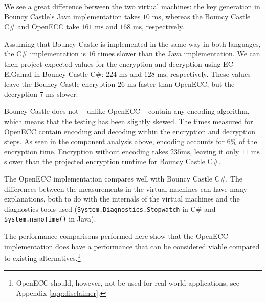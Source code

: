 We see a great difference between the two virtual machines: the key generation in Bouncy Castle's Java implementation takes
\(10 \text{ ms}\), whereas the Bouncy Castle C\# and OpenECC take \(161 \text{ ms}\) and \(168 \text{ ms}\), respectively.

Assuming that Bouncy Castle is implemented in the same way in both languages, the C\# implementation is \(16\) times slower
than the Java implementation. We can then project expected values for the encryption and decryption using EC ElGamal in Bouncy
Castle C\#: \(224 \text{ ms}\) and \(128 \text{ ms}\), respectively. These values leave the Bouncy Castle encryption \(26 \text{ ms}\)
faster than OpenECC, but the decryption \(7 \text{ ms}\) slower.

Bouncy Castle does not -- unlike OpenECC -- contain any encoding algorithm, which means that the testing has been slightly skewed.
The times measured for OpenECC contain encoding and decoding within the encryption and decryption steps. As seen in the component
analysis above, encoding accounts for \(6\%\) of the encryption time. Encryption without encoding takes \(235 \text{ms}\), leaving it
only \(11 \text{ ms}\) slower than the projected encryption runtime for Bouncy Castle C\#.

The OpenECC implementation compares well with Bouncy Castle C\#. The differences between the measurements in the virtual machines
can have many explanations, both to do with the internals of the virtual machines and the diagnostics tools used
(\texttt{System.Diagnostics.Stopwatch} in C\# and \texttt{System.nanoTime()} in Java).

The performance comparisons performed here show that the OpenECC implementation does have a performance that can be considered viable
compared to existing alternatives.\footnote{OpenECC should, however, not be used for real-world applications, see Appendix
\ref{app:disclaimer}.}